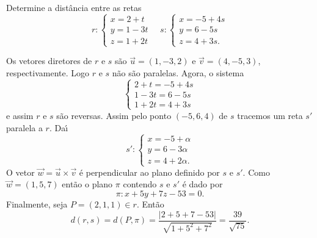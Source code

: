 \begin{exemplo}
    Determine a dist\^ancia entre as retas
    \[
        r: \begin{cases}
            x = 2 + t\\
            y = 1 - 3t\\
            z = 1 + 2t
        \end{cases} \quad s: \begin{cases}
            x = -5 + 4s\\
            y = 6 - 5s\\
            z = 4 + 3s.
        \end{cases}
    \]
    \begin{solucao}
        Os vetores diretores de $r$ e $s$ s\~ao $\vec{u} = (1,-3,2)$ e $\vec{v} = (4,-5,3)$, respectivamente. Logo $r$ e $s$ n\~ao s\~ao paralelas. Agora, o sistema
        \[
            \begin{cases}
                2 + t = -5 + 4s\\
                1 - 3t = 6 - 5s\\
                1 + 2t = 4 + 3s
            \end{cases}
        \]
        e assim $r$ e $s$ s\~ao reversas. Assim pelo ponto $(-5,6,4)$ de $s$ tracemos um reta $s'$ paralela a $r$. Da{\'\i}
        \[
            s' : \begin{cases}
                x = -5 + \alpha\\
                y = 6 - 3\alpha\\
                z = 4 + 2\alpha.
            \end{cases}
        \]
        O vetor $\vec{w} = \vec{u}\times\vec{v}$ \'e perpendicular ao plano definido por $s$ e $s'$. Como $\vec{w} = (1,5,7)$ ent\~ao o plano $\pi$ contendo $s$ e $s'$ \'e dado por
        \[
            \pi : x + 5y + 7z - 53 = 0.
        \]
        Finalmente, seja $P = (2,1,1) \in r$. Ent\~ao
        \[
            d(r,s) = d(P,\pi) = \dfrac{|2 + 5 + 7 - 53|}{\sqrt{1 + 5^2 + 7^2}} = \dfrac{39}{\sqrt{75}}.
        \]


    \end{solucao}
\end{exemplo}

